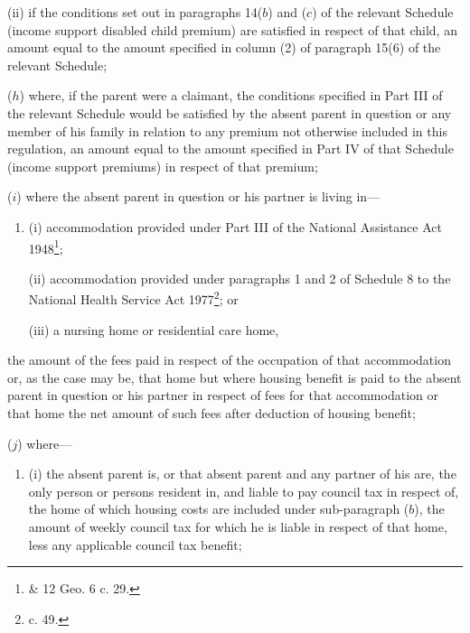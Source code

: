 \documentclass[12pt,a4paper]{article}
\begin{document}
\begin{enumerate}
\begin{enumerate}
(ii) if the conditions set out in paragraphs 14($b$) and ($c$) of the relevant Schedule (income support disabled child premium) are satisfied in respect of that child, an amount equal to the amount specified in column (2) of paragraph 15(6) of the relevant Schedule;
\end{enumerate}

($h$) where, if the parent were a claimant, the conditions specified in Part III of the relevant Schedule would be satisfied by the absent parent in question or any member of his family in relation to any premium not otherwise included in this regulation, an amount equal to the amount specified in Part IV of that Schedule (income support premiums) in respect of that premium;

($i$) where the absent parent in question or his partner is living in—
\begin{enumerate}\item[]
(i) accommodation provided under Part III of the National Assistance Act 1948\footnote{ \& 12 Geo. 6 c. 29.};

(ii) accommodation provided under paragraphs 1 and 2 of Schedule 8 to the National Health Service Act 1977\footnote{ c. 49.}; or

(iii) a nursing home or residential care home,
\end{enumerate}
the amount of the fees paid in respect of the occupation of that accommodation or, as the case may be, that home
but where housing benefit is paid to the absent parent in question or his partner in respect of fees for that accommodation or that home the net amount of such fees after deduction of housing benefit;  %


($j$) where—
\begin{enumerate}\item[]
(i) the absent parent is, or that absent parent and any partner of his are, the only person or persons resident in, and liable to pay council tax in respect of, the home of which housing costs are included under sub-paragraph ($b$), the amount of weekly council tax for which he is liable in respect of that home, less any applicable council tax benefit;


\end{enumerate}
\end{enumerate}
\end{document}
